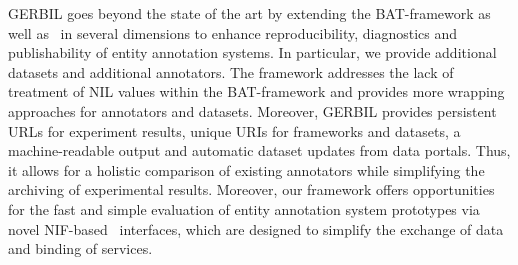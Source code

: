 GERBIL goes beyond the state of the art by extending the BAT-framework as well as~\cite{rizzo2014} in several dimensions to enhance reproducibility, diagnostics and publishability of entity annotation systems. In particular, we provide \numberOfadditionalDatasets additional datasets and \numberOfadditionalAnnotators additional annotators. The framework addresses the lack of treatment of NIL values within the BAT-framework and provides more wrapping approaches for annotators and datasets. Moreover, GERBIL provides persistent URLs for experiment results, unique URIs for frameworks and datasets, a machine-readable output and automatic dataset updates from data portals. Thus, it allows for a holistic comparison of existing annotators while simplifying the archiving of experimental results. Moreover, our framework offers opportunities for the fast and simple evaluation of entity annotation system prototypes via novel NIF-based~\cite{NIF} interfaces, which are designed to simplify the exchange of data and binding of services.



